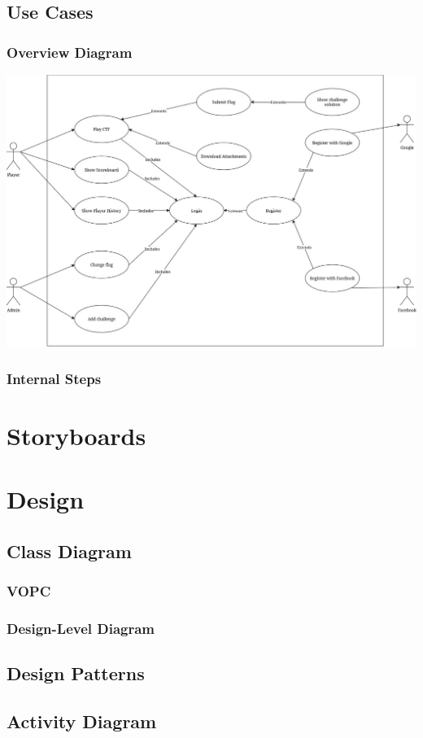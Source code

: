 \documentclass[12pt]{article}
\begin{document}
\subsection{Use Cases}
\subsubsection{Overview Diagram}
\includegraphics[scale=0.4]{Use Case Diagram.jpg}
\subsubsection{Internal Steps}
\section{Storyboards}
\section{Design}
\subsection{Class Diagram}
\subsubsection{VOPC}
\subsubsection{Design-Level Diagram}
\subsection{Design Patterns}
\subsection{Activity Diagram}
\end{document}
